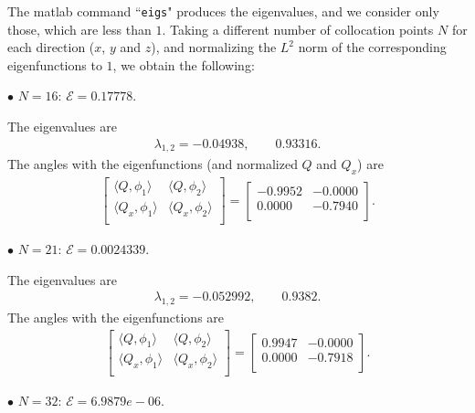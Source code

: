 \documentclass[12pt,letterpaper]{amsart}
\theoremstyle{remark}
\numberwithin{equation}{section}
\numberwithin{theorem}{section}
\numberwithin{table}{section}
\begin{document}
The matlab command ``\texttt{eigs}" produces the eigenvalues, and we consider only those, which are less than $1$. 
Taking a different number of collocation points $N$ for each direction ($x$, $y$ and $z$), and normalizing the $L^2$ norm of the corresponding eigenfunctions to $1$, we obtain the following: 

$\bullet$ \underline{\bf $N=16$}: $\mathcal{E}=0.17778$. 

The eigenvalues are
\begin{align}
\lambda_{1,2}=   -0.04938, \qquad 0.93316.
\end{align}
The angles with the eigenfunctions (and normalized $Q$ and $Q_x$) are 
\begin{align}
\left[ \begin{matrix}
\langle Q,  \phi_1 \rangle & \langle Q, \phi_2 \rangle \\
\langle Q_x, \phi_1 \rangle & \langle Q_x, \phi_2 \rangle \\
\end{matrix} \right] = \left[ \begin{matrix}
  -0.9952 &  -0.0000 \\
  0.0000 &  -0.7940 \\
\end{matrix} \right].
\end{align}

$\bullet$ \underline{\bf $N=21$}: $\mathcal{E}=0.0024339$. 

The eigenvalues are
\begin{align}
\lambda_{1,2}=   -0.052992, \qquad 0.9382.
\end{align}
The angles with the eigenfunctions are
\begin{align}
\left[ \begin{matrix}
\langle Q,  \phi_1 \rangle & \langle Q, \phi_2 \rangle \\
\langle Q_x, \phi_1 \rangle & \langle Q_x, \phi_2 \rangle \\
\end{matrix} \right] = \left[ \begin{matrix}
  0.9947 &  -0.0000 \\
  0.0000 &  -0.7918 \\
\end{matrix} \right].
\end{align}

$\bullet$ \underline{\bf $N=32$}: $\mathcal{E}=6.9879e-06$. 
\end{document}
